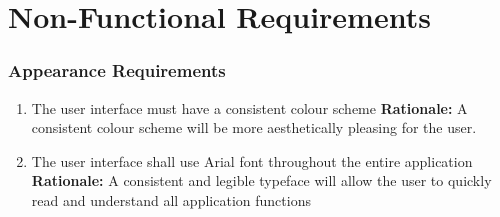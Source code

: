\documentclass[]{article}
\begin{document}

\section{Non-Functional Requirements}
\label{sec:non-functional_requirements}


\subsubsection{Appearance Requirements}
\label{ssub:appearance_requirements}
\begin{enumerate}[{LF-A}1. ]
	\item The user interface must have a consistent colour scheme
    \newline  \textbf{Rationale:} A consistent colour scheme will be more aesthetically pleasing for the user.
    \item The user interface shall use Arial font throughout the entire application
    \newline \textbf{Rationale:} A consistent and legible typeface will allow the user to quickly read and understand all application functions
\end{enumerate}
\end{document}
